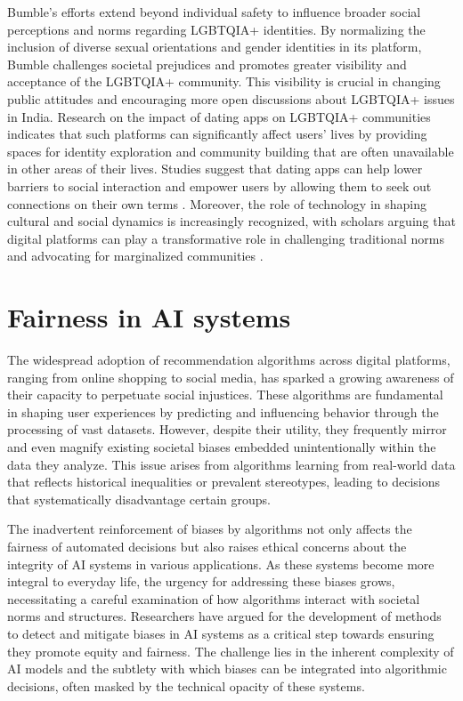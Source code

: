Bumble’s efforts extend beyond individual safety to influence broader social perceptions and norms regarding LGBTQIA+ identities. By normalizing the inclusion of diverse sexual orientations and gender identities in its platform, Bumble challenges societal prejudices and promotes greater visibility and acceptance of the LGBTQIA+ community. This visibility is crucial in changing public attitudes and encouraging more open discussions about LGBTQIA+ issues in India. Research on the impact of dating apps on LGBTQIA+ communities indicates that such platforms can significantly affect users' lives by providing spaces for identity exploration and community building that are often unavailable in other areas of their lives. Studies suggest that dating apps can help lower barriers to social interaction and empower users by allowing them to seek out connections on their own terms \cite{Blackwell_2015}. Moreover, the role of technology in shaping cultural and social dynamics is increasingly recognized, with scholars arguing that digital platforms can play a transformative role in challenging traditional norms and advocating for marginalized communities \cite{Publishers_Distributors4753/23_Road_Delhi}.

\section{Fairness in AI systems}
The widespread adoption of recommendation algorithms across digital platforms, ranging from online shopping to social media, has sparked a growing awareness of their capacity to perpetuate social injustices. These algorithms are fundamental in shaping user experiences by predicting and influencing behavior through the processing of vast datasets. However, despite their utility, they frequently mirror and even magnify existing societal biases embedded unintentionally within the data they analyze. This issue arises from algorithms learning from real-world data that reflects historical inequalities or prevalent stereotypes, leading to decisions that systematically disadvantage certain groups.

The inadvertent reinforcement of biases by algorithms not only affects the fairness of automated decisions but also raises ethical concerns about the integrity of AI systems in various applications. As these systems become more integral to everyday life, the urgency for addressing these biases grows, necessitating a careful examination of how algorithms interact with societal norms and structures. Researchers have argued for the development of methods to detect and mitigate biases in AI systems as a critical step towards ensuring they promote equity and fairness. The challenge lies in the inherent complexity of AI models and the subtlety with which biases can be integrated into algorithmic decisions, often masked by the technical opacity of these systems.

